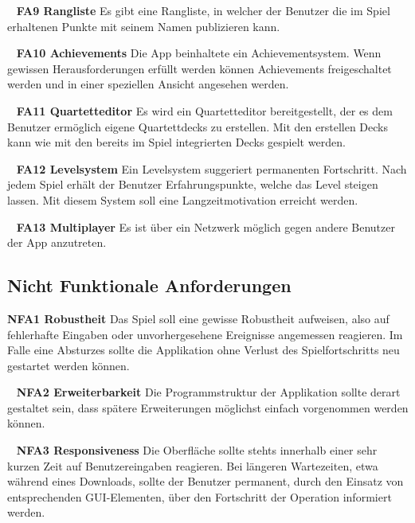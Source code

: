 \documentclass{scrartcl}
\begin{document}
\ \newline
\textbf{FA9 Rangliste} \newline
Es gibt eine Rangliste, in welcher der Benutzer die im Spiel erhaltenen Punkte
mit seinem Namen publizieren kann.

\ \newline
\textbf{FA10 Achievements} \newline
Die App beinhaltete ein Achievementsystem. Wenn gewissen Herausforderungen
erfüllt werden können Achievements freigeschaltet werden und in einer speziellen
Ansicht angesehen werden.

\ \newline
\textbf{FA11 Quartetteditor} \newline
Es wird ein Quartetteditor bereitgestellt, der es dem Benutzer ermöglich
eigene Quartettdecks zu erstellen. Mit den erstellen Decks kann wie mit den
bereits im Spiel integrierten Decks gespielt werden.

\ \newline
\textbf{FA12 Levelsystem} \newline
Ein Levelsystem suggeriert permanenten Fortschritt. Nach jedem Spiel erhält der
Benutzer Erfahrungspunkte, welche das Level steigen lassen. Mit diesem System
soll eine Langzeitmotivation erreicht werden.

\ \newline
\textbf{FA13 Multiplayer} \newline
Es ist über ein Netzwerk möglich gegen andere Benutzer der App anzutreten.


\subsection{Nicht Funktionale Anforderungen}

\textbf{NFA1 Robustheit} \newline
Das Spiel soll eine gewisse Robustheit aufweisen, also auf fehlerhafte Eingaben
oder unvorhergesehene Ereignisse angemessen reagieren. Im Falle eine Absturzes
sollte die Applikation ohne Verlust des Spielfortschritts neu gestartet werden
können.

\ \newline
\textbf{NFA2 Erweiterbarkeit} \newline
Die Programmstruktur der Applikation sollte derart gestaltet sein, dass
spätere Erweiterungen möglichst einfach vorgenommen werden können.

\ \newline
\textbf{NFA3 Responsiveness} \newline
Die Oberfläche sollte stehts innerhalb einer sehr kurzen Zeit auf
Benutzereingaben reagieren. Bei längeren Wartezeiten, etwa während eines
Downloads, sollte der Benutzer permanent, durch den Einsatz von entsprechenden
GUI-Elementen, über den Fortschritt der Operation informiert werden.
\end{document}
